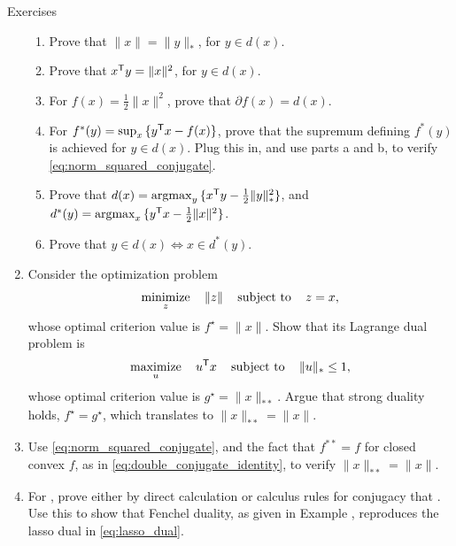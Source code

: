 \begin{xcb}{Exercises}
\begin{enumerate}[label=\thechapter.\arabic*]
\begin{enumerate}[label=\alph*.] 
\item Prove that $\|x\| = \|y\|_*$, for $y \in d(x)$.
\item Prove that $x^{\mathsf{T}} y = \|x\|^2$, for $y \in d(x)$. 
\item For $f(x) = \frac{1}{2} \|x\|^2$, prove that $\partial f(x) = d(x)$. 
\item For $f^*(y) = \sup_x \, \{ y^{\mathsf{T}} x - f(x) \}$, prove that the supremum
  defining $f^*(y)$ is achieved for $y \in d(x)$. Plug this in, and use parts a
  and b, to verify \eqref{eq:norm_squared_conjugate}. 
\item Prove that $d(x) = \operatorname*{argmax}_y \, \{ x^{\mathsf{T}} y - \frac{1}{2} \|y\|_*^2 \}$, and 
  $d^*(y) = \operatorname*{argmax}_x \, \{ y^{\mathsf{T}} x - \frac{1}{2} \|x\|^2 \}$. 
\item Prove that $y \in d(x) \iff x \in d^*(y)$.
\end{enumerate}

\item \label{ex:dual_norm_dual2}
  Consider the optimization problem 
  \[
  \operatorname*{minimize}_z \quad \|z\| \quad \operatorname{subject\,\,to} \quad z = x,
  \]
  whose optimal criterion value is $f^\star = \|x\|$. Show that its Lagrange 
  dual problem is 
  \[
  \operatorname*{maximize}_u \quad u^{\mathsf{T}} x \quad \operatorname{subject\,\,to} \quad \|u\|_* \leq 1,
  \]
  whose optimal criterion value is $g^\star = \|x\|_{**}$. Argue that strong 
  duality holds, $f^\star = g^\star$, which translates to $\|x\|_{**} = \|x\|$. 

\item \label{ex:dual_norm_dual3}
  Use \eqref{eq:norm_squared_conjugate}, and the fact that $f^{**} = f$ for
  closed convex $f$, as in \eqref{eq:double_conjugate_identity}, to verify
  $\|x\|_{**} = \|x\|$.  

\item \label{ex:lasso_fenchel_dual}
  For , prove either by direct
  calculation or calculus rules for conjugacy that . Use this to show that Fenchel
  duality, as given in Example , reproduces the lasso 
  dual in \eqref{eq:lasso_dual}.


\end{enumerate}
\end{xcb}
